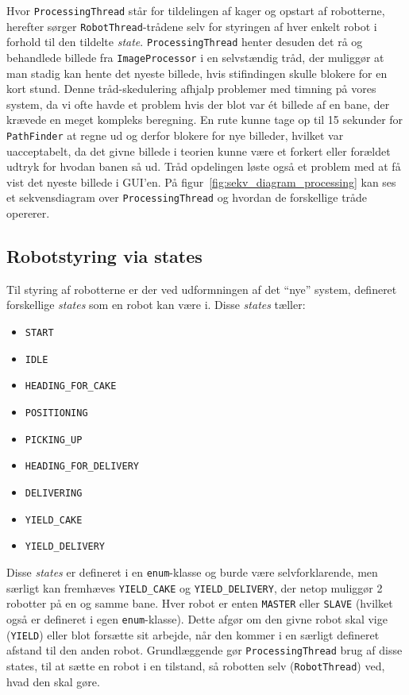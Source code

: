 Hvor \texttt{ProcessingThread} står for tildelingen af kager og opstart af robotterne, herefter sørger \texttt{RobotThread}-trådene selv for styringen af hver enkelt robot i forhold til den tildelte \textit{state}. \texttt{ProcessingThread} henter desuden det rå og  behandlede billede fra \texttt{ImageProcessor} i en selvstændig tråd, der muliggør at man stadig kan hente det nyeste billede, hvis stifindingen skulle blokere for en kort stund. Denne tråd-skedulering afhjalp problemer med timning på vores system, da vi ofte havde et problem hvis der blot var ét billede af en bane, der krævede en meget kompleks beregning. En rute kunne tage op til 15 sekunder for \texttt{PathFinder} at regne ud og derfor blokere for nye billeder, hvilket var uacceptabelt, da det givne billede i teorien kunne være et forkert eller forældet udtryk for hvodan banen så ud. Tråd opdelingen løste også et problem med at få vist det nyeste billede i GUI’en. På figur~\vref{fig:sekv_diagram_processing} kan ses et sekvensdiagram over \texttt{ProcessingThread} og hvordan de forskellige tråde opererer.

\subsection{Robotstyring via states}
Til styring af robotterne er der ved udformningen af det "`nye"' system, defineret forskellige \textit{states} som en robot kan være i. Disse \textit{states} tæller:
\begin{itemize}
\item \texttt{START}
\item \texttt{IDLE}
\item \texttt{HEADING\_FOR\_CAKE}
\item \texttt{POSITIONING}
\item \texttt{PICKING\_UP}
\item \texttt{HEADING\_FOR\_DELIVERY}
\item \texttt{DELIVERING}
\item \texttt{YIELD\_CAKE}
\item \texttt{YIELD\_DELIVERY}
\end{itemize}
Disse \textit{states} er defineret i en \texttt{enum}-klasse og burde være selvforklarende, men særligt kan fremhæves \texttt{YIELD\_CAKE} og \texttt{YIELD\_DELIVERY}, der netop muliggør 2 robotter på en og samme bane. Hver robot er enten \texttt{MASTER} eller \texttt{SLAVE} (hvilket også er defineret i egen \texttt{enum}-klasse). Dette afgør om den givne robot skal vige (\texttt{YIELD}) eller blot forsætte sit arbejde, når den kommer i en særligt defineret afstand til den anden robot. Grundlæggende gør \texttt{ProcessingThread} brug af disse states, til at sætte en robot i en tilstand, så robotten selv (\texttt{RobotThread}) ved, hvad den skal gøre.


